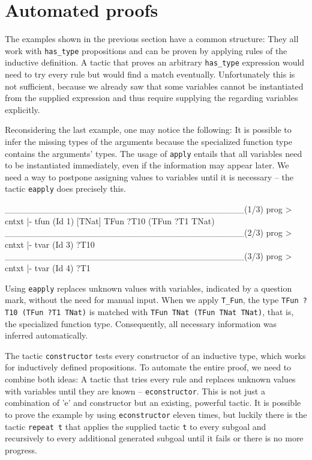 \documentclass[fleqn]{scrreprt}
\newcommand{\coqinline}[1]{\texttt{#1}}
\begin{document}
\section{Automated proofs}
\label{autoproof}
The examples shown in the previous section have a common structure: They all work with \coqinline{has_type} propositions and can be proven by applying rules of the inductive definition. A tactic that proves an arbitrary \coqinline{has_type} expression would need to try every rule but would find a match eventually. Unfortunately this is not sufficient, because we already saw that some variables cannot be instantiated from the supplied expression and thus require supplying the regarding variables explicitly.
\par
Reconsidering the last example, one may notice the following: It is possible to infer the missing types of the arguments because the specialized function type contains the arguments' types. The usage of \coqinline{apply} entails that all variables need to be instantiated immediately, even if the information may appear later. We need a way to postpone assigning values to variables until it is necessary -- the tactic \coqinline{eapply} does precisely this. 
\begin{coqcode}
______________________________________(1/3)
prog > cntxt |- tfun (Id 1) [TNat] \in TFun ?T10 (TFun ?T1 TNat)
______________________________________(2/3)
prog > cntxt |- tvar (Id 3) \in ?T10
______________________________________(3/3)
prog > cntxt |- tvar (Id 4) \in ?T1
\end{coqcode}
Using \coqinline{eapply} replaces unknown values with variables, indicated by a question mark, without the need for manual input. When we apply \coqinline{T_Fun}, the type \coqinline{TFun ?T10 (TFun ?T1 TNat)} is matched with \coqinline{TFun TNat (TFun TNat TNat)}, that is, the specialized function type. Consequently, all necessary information was inferred automatically.
\par
The tactic \coqinline{constructor} tests every constructor of an inductive type, which works for inductively defined propositions. To automate the entire proof, we need to combine both ideas: A tactic that tries every rule and replaces unknown values with variables until they are known -- \coqinline{econstructor}. This is not just a combination of 'e' and constructor but an existing, powerful tactic. It is possible to prove the example by using \coqinline{econstructor} eleven times, but luckily there is the tactic \coqinline{repeat t} that applies the supplied tactic \coqinline{t} to every subgoal and recursively to every additional generated subgoal until it fails or there is no more progress.
\end{document}
